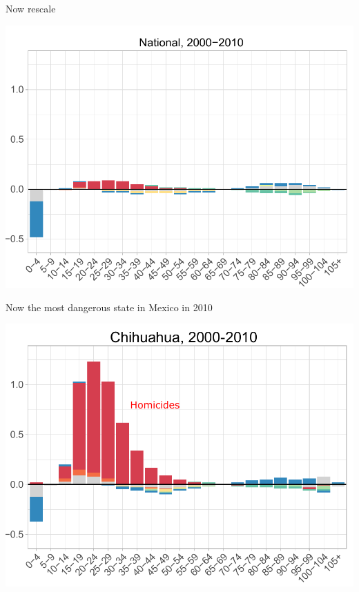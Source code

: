 \documentclass[xcolor={dvipsnames}]{beamer}
\begin{document}
\begin{frame}

\Large{
Now rescale

				\begin{center}
		\includegraphics[scale=.65]{Figures/Cause_ed_decomp_Males2}
				\end{center}				

}
\end{frame}

\begin{frame}

\Large{
Now the most dangerous state in Mexico in 2010

				\begin{center}
		\includegraphics[scale=.65]{Figures/Cause_ed_decomp_Males_Chihuahua}
				\end{center}				

}
\end{frame}
\end{document}

